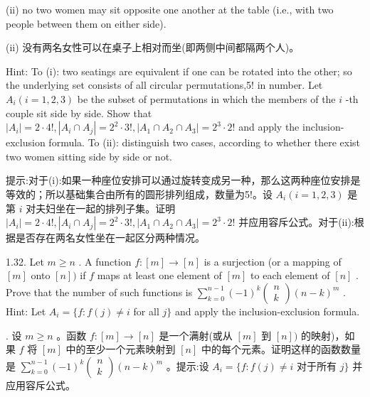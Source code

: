 \documentclass[10pt]{article}
\begin{document}
(ii) no two women may sit opposite one another at the table (i.e., with two people between them on either side).

\begin{tcolorbox}\relax
(ii) 没有两名女性可以在桌子上相对而坐(即两侧中间都隔两个人)。
\end{tcolorbox}

Hint: To (i): two seatings are equivalent if one can be rotated into the other; so the underlying set consists of all circular permutations,5! in number. Let \({A}_{i}\left( {i = 1,2,3}\right)\) be the subset of permutations in which the members of the \(i\) -th couple sit side by side. Show that \(\left| {A}_{i}\right|  = 2 \cdot  4!,\left| {{A}_{i} \cap  {A}_{j}}\right|  = {2}^{2} \cdot  3!,\left| {{A}_{1} \cap  {A}_{2} \cap  {A}_{3}}\right|  = {2}^{3} \cdot  2!\) and apply the inclusion-exclusion formula. To (ii): distinguish two cases, according to whether there exist two women sitting side by side or not.

\begin{tcolorbox}\relax
提示:对于(i):如果一种座位安排可以通过旋转变成另一种，那么这两种座位安排是等效的；所以基础集合由所有的圆形排列组成，数量为5!。设 \({A}_{i}\left( {i = 1,2,3}\right)\) 是第 \(i\) 对夫妇坐在一起的排列子集。证明 \(\left| {A}_{i}\right|  = 2 \cdot  4!,\left| {{A}_{i} \cap  {A}_{j}}\right|  = {2}^{2} \cdot  3!,\left| {{A}_{1} \cap  {A}_{2} \cap  {A}_{3}}\right|  = {2}^{3} \cdot  2!\) 并应用容斥公式。对于(ii):根据是否存在两名女性坐在一起区分两种情况。
\end{tcolorbox}

1.32. Let \(m \geq  n\) . A function \(f : \left\lbrack  m\right\rbrack   \rightarrow  \left\lbrack  n\right\rbrack\) is a surjection (or a mapping of \(\left\lbrack  m\right\rbrack\) onto \(\left\lbrack  n\right\rbrack  )\) if \(f\) maps at least one element of \(\left\lbrack  m\right\rbrack\) to each element of \(\left\lbrack  n\right\rbrack\) . Prove that the number of such functions is \(\mathop{\sum }\limits_{{k = 0}}^{{n - 1}}{\left( -1\right) }^{k}\left( \begin{array}{l} n \\  k \end{array}\right) {\left( n - k\right) }^{m}\) . Hint: Let \({A}_{i} = \{ f : f\left( j\right)  \neq  i\) for all \(j\}\) and apply the inclusion-exclusion formula.

\begin{tcolorbox}. 设 \(m \geq  n\) 。函数 \(f : \left\lbrack  m\right\rbrack   \rightarrow  \left\lbrack  n\right\rbrack\) 是一个满射(或从 \(\left\lbrack  m\right\rbrack\) 到 \(\left\lbrack  n\right\rbrack  )\) 的映射)，如果 \(f\) 将 \(\left\lbrack  m\right\rbrack\) 中的至少一个元素映射到 \(\left\lbrack  n\right\rbrack\) 中的每个元素。证明这样的函数数量是 \(\mathop{\sum }\limits_{{k = 0}}^{{n - 1}}{\left( -1\right) }^{k}\left( \begin{array}{l} n \\  k \end{array}\right) {\left( n - k\right) }^{m}\) 。提示:设 \({A}_{i} = \{ f : f\left( j\right)  \neq  i\) 对于所有 \(j\}\) 并应用容斥公式。
\end{tcolorbox}
\end{document}

